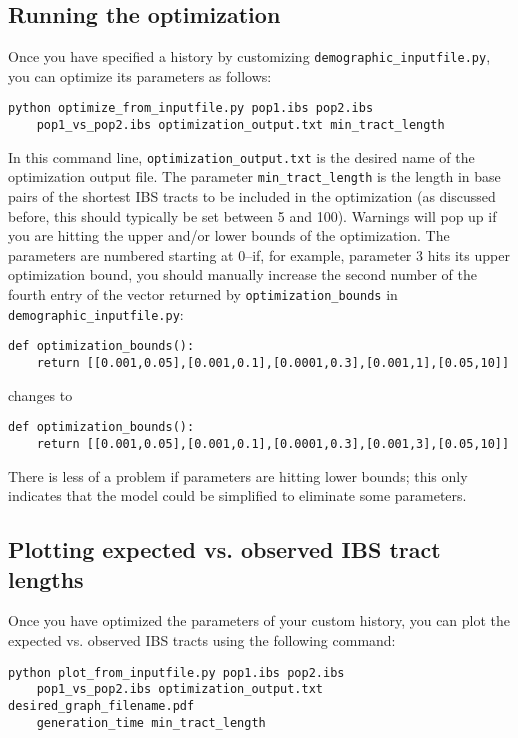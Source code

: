 \documentclass[12pt]{article}
\begin{document}
\subsection{Running the optimization}

Once you have specified a history by customizing \verb|demographic_inputfile.py|, you can optimize its parameters as follows:

\begin{Verbatim}
python optimize_from_inputfile.py pop1.ibs pop2.ibs 
	pop1_vs_pop2.ibs optimization_output.txt min_tract_length
\end{Verbatim}

In this command line, \verb|optimization_output.txt| is the desired name of the optimization output file. The parameter \verb|min_tract_length| is the length in base pairs of the shortest IBS tracts to be included in the optimization (as discussed before, this should typically be set between 5 and 100). Warnings will pop up if you are hitting the upper and/or lower bounds of the optimization. The parameters are numbered starting at 0--if, for example, parameter 3 hits its upper optimization bound, you should manually increase the second number of the fourth entry of the vector returned by \verb|optimization_bounds| in \verb|demographic_inputfile.py|:

\begin{verbatim}
def optimization_bounds():
	return [[0.001,0.05],[0.001,0.1],[0.0001,0.3],[0.001,1],[0.05,10]]
\end{verbatim}

changes to

\begin{verbatim}
def optimization_bounds():
	return [[0.001,0.05],[0.001,0.1],[0.0001,0.3],[0.001,3],[0.05,10]]
\end{verbatim}

There is less of a problem if parameters are hitting lower bounds; this only indicates that the model could be simplified to eliminate some parameters.


\subsection{Plotting expected vs. observed IBS tract lengths}

Once you have optimized the parameters of your custom history, you can plot the expected vs. observed IBS tracts using the following command:


\begin{Verbatim}
python plot_from_inputfile.py pop1.ibs pop2.ibs 
	pop1_vs_pop2.ibs optimization_output.txt desired_graph_filename.pdf 
	generation_time min_tract_length
\end{Verbatim}
\end{document}
